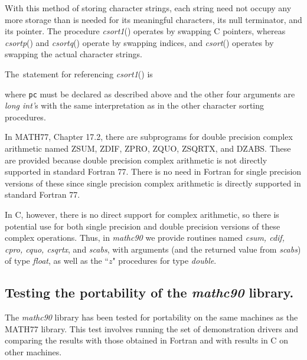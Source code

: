 \documentclass[twoside]{MATH77}
\begin{document}
\hspace{.2in}{\tt char *pc[100];}

With this method of storing character strings, each string need not occupy
any more storage than is needed for its meaningful characters, its null
terminator, and its pointer. The procedure {\em csort1}() operates by swapping C
pointers, whereas {\em csortp}() and {\em csortq}() operate by swapping indices, and
{\em csort}() operates by swapping the actual character strings.

The~statement for referencing {\em csort1}() is

\hspace{.2in}{\tt csort1( pc, m, n, k, l);}

where {\tt pc} must be declared as described above and the other four arguments
are {\em long int'}s with the same interpretation as in the other character
sorting procedures.

In MATH77, Chapter 17.2, there are subprograms for double precision
complex arithmetic named ZSUM, ZDIF, ZPRO, ZQUO, ZSQRTX, and DZABS.  These
are provided because double precision complex arithmetic is not directly
supported in standard Fortran 77.  There is no need in Fortran for single
precision versions of these since single precision complex arithmetic is
directly supported in standard Fortran 77.

In C, however, there is no direct support for complex arithmetic, so
there is potential use for both single precision and double precision
versions of these complex operations.  Thus, in {\em mathc90}
we provide routines named
{\em csum, cdif, cpro, cquo, csqrtx}, and {\em scabs},
with arguments (and the returned value from {\em scabs}) of type
{\em float}, as well as the ``$z$" procedures for type {\em double}.

\subsection{Testing the portability of the {\em mathc90} library.
\label{testport}}

The {\em mathc90} library has been tested for portability on the same
machines as the MATH77 library.  This test involves running the set of
demonstration drivers and comparing the results with those obtained in
Fortran and with results in C on other machines.
\begcodenp
\end{document}
